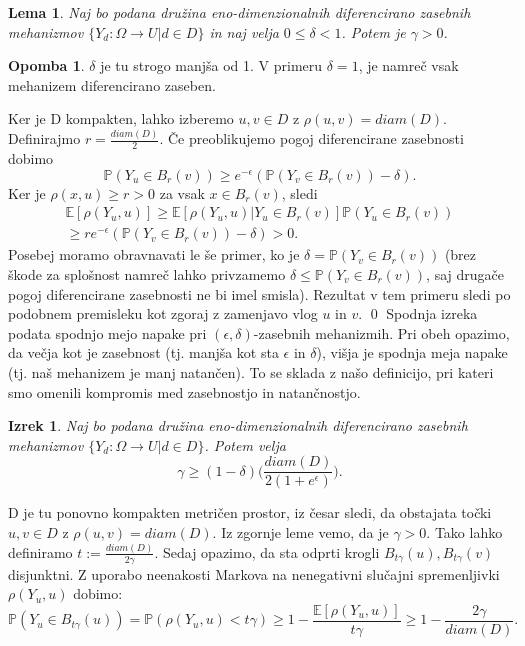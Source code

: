 \documentclass[12pt,a4paper]{amsart}
\theoremstyle{definition} %
\newtheorem{opomba}[definicija]{Opomba}
\theoremstyle{plain} %
\newtheorem{lema}[definicija]{Lema}
\newtheorem{izrek}[definicija]{Izrek}
\begin{document}
\begin{lema}
 Naj bo podana družina eno-dimenzionalnih diferencirano zasebnih mehanizmov $\{ Y_d: \Omega \rightarrow U | d \in D\}$ in naj velja $0 \leq \delta < 1$. Potem je $\gamma > 0$.
\end{lema}
\begin{opomba}
 $\delta$ je tu strogo manjša od 1. V primeru $\delta = 1$, je namreč vsak mehanizem diferencirano zaseben.
 \end{opomba}
\proof
 Ker je D kompakten, lahko izberemo $u,v \in D$ z $\rho(u,v)=diam(D)$. Definirajmo $r=\frac{diam(D)}{2}$. Če preoblikujemo pogoj diferencirane zasebnosti dobimo $$\mathbb{P}(Y_u \in B_r(v)) \geq e^{-\epsilon}(\mathbb{P}(Y_v \in B_r(v)) -\delta).$$ Ker je $\rho(x,u) \geq r > 0$ za vsak $x \in B_r(v)$, sledi 
\begin{gather*}
\mathbb{E}[\rho(Y_u,u)] \geq \mathbb{E}[\rho(Y_u,u) | Y_u \in B_r(v)] \mathbb{P}(Y_u \in B_r(v)) \\
\geq r e^{-\epsilon}(\mathbb{P}(Y_v \in B_r(v)) -\delta) > 0.
\end{gather*}
Posebej moramo obravnavati le še primer, ko je $\delta = \mathbb{P}(Y_v \in B_r(v))$ (brez škode za splošnost namreč lahko privzamemo $\delta \leq \mathbb{P}(Y_v \in B_r(v))$, saj drugače pogoj diferencirane zasebnosti ne bi imel smisla). Rezultat v tem primeru sledi po podobnem premisleku kot zgoraj z zamenjavo vlog $u$ in $v$.
\qed
\newline
\newline
Spodnja izreka podata spodnjo mejo napake pri $(\epsilon, \delta)$-zasebnih mehanizmih. Pri obeh opazimo, da večja kot je zasebnost (tj. manjša kot sta $\epsilon$ in $\delta$), višja je spodnja meja napake (tj. naš mehanizem je manj natančen). To se sklada z našo definicijo, pri kateri smo omenili kompromis med zasebnostjo in natančnostjo.
\begin{izrek}
 Naj bo podana družina eno-dimenzionalnih diferencirano zasebnih mehanizmov $\{ Y_d: \Omega \rightarrow U | d \in D\}$. Potem velja $$\gamma  \geq (1-\delta)\Big(\frac{diam(D)}{2(1+e^\epsilon)}\Big).$$
\end{izrek}
\proof
D je tu ponovno kompakten metričen prostor, iz česar sledi, da obstajata točki $u, v \in D$ z $\rho(u,v) = diam(D)$. Iz zgornje leme vemo, da je $\gamma > 0$. Tako lahko definiramo $t := \frac{diam(D)}{2\gamma}$. Sedaj opazimo, da sta odprti krogli $B_{t\gamma}(u), B_{t\gamma}(v) $ disjunktni. Z uporabo neenakosti Markova na nenegativni slučajni spremenljivki $\rho(Y_u, u)$ dobimo: $$\mathbb{P}(Y_u \in B_{t\gamma}(u)) = \mathbb{P}(\rho(Y_u,u) < t\gamma) \geq 1 - \frac{\mathbb{E}[\rho(Y_u,u)]}{t\gamma} \ge 1 - \frac{2\gamma}{diam(D)}. $$ 
\end{document}

